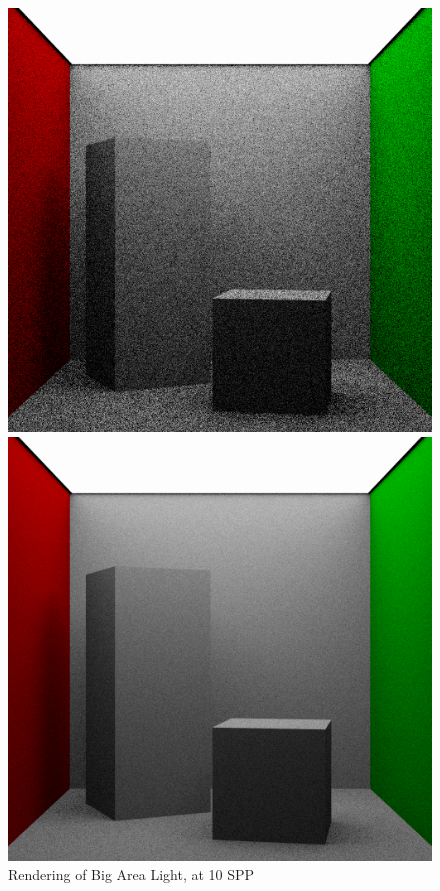 \documentclass[a4paper]{myarticle}
\begin{document}
\begin{figure}[H]
  \begin{minipage}[t]{.3\textwidth}
      \centering
      \includegraphics[width=\textwidth]{q3/big_0_10.png}
      \caption{Rendering of Big Area Light, at 10 SPP}
  \end{minipage}
  \hfill
  \begin{minipage}[t]{.3\textwidth}
      \centering
      \includegraphics[width=\textwidth]{q3/big_0_100.png}

\end{minipage}
\end{figure}
\end{document}

